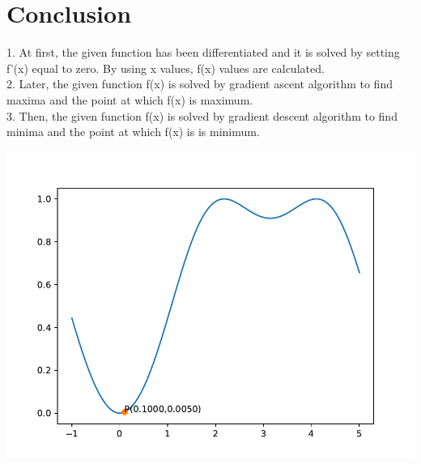 \documentclass[10pt,twocolumn]{article}
\begin{document}
\section{Conclusion}
\begin{flushleft}
1. At first, the given function has been differentiated and it is solved by setting f'(x) equal to zero. By using x values, f(x) values are calculated.\\
\vspace{0.25cm}
2. Later, the given function f(x) is solved by gradient ascent algorithm to find maxima and the point at which f(x) is maximum.\\
\vspace{0.25cm}
3. Then, the given function f(x) is solved by gradient descent algorithm to find minima and the point at which f(x) is is minimum.\\
\vspace{0.25cm}
\end{flushleft}
 \includegraphics[scale=0.6]{opt2.pdf} 
\endcenter
\end{document}
